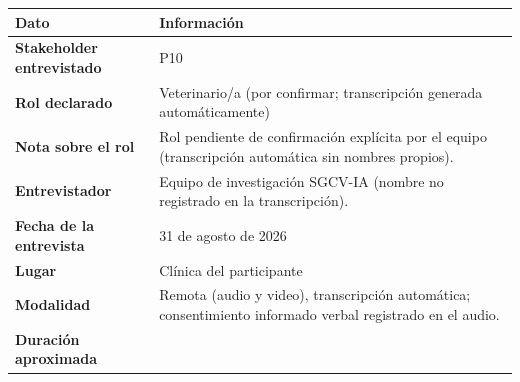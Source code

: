\documentclass[
]{article}
\newcounter{none} %
\begin{document}
{\def\LTcaptype{none} %
\begin{longtable}[]{|
  >{\raggedright\arraybackslash}p{}|
  >{\raggedright\arraybackslash}p{}|}
\hline
\begin{minipage}[b]{\linewidth}\centering
\textbf{Dato}
\end{minipage} & \begin{minipage}[b]{\linewidth}\centering
\textbf{Información}
\end{minipage} \\
\hline
\endhead
\hline
\endlastfoot
\textbf{Stakeholder entrevistado} & \begin{minipage}[t]{\linewidth}\raggedright
P10
\end{minipage} \\
\hline
\textbf{Rol declarado} & \begin{minipage}[t]{\linewidth}\raggedright
Veterinario/a (por confirmar; transcripción generada automáticamente)
\end{minipage} \\
\hline
\textbf{Nota sobre el rol} & \begin{minipage}[t]{\linewidth}\raggedright
Rol pendiente de confirmación explícita por el equipo (transcripción automática sin nombres propios).
\end{minipage} \\
\hline
\textbf{Entrevistador} & \begin{minipage}[t]{\linewidth}\raggedright
Equipo de investigación SGCV-IA (nombre no registrado en la transcripción).
\end{minipage} \\
\hline
\textbf{Fecha de la entrevista} & \begin{minipage}[t]{\linewidth}\raggedright
31 de agosto de 2026
\end{minipage} \\
\hline
\textbf{Lugar} & \begin{minipage}[t]{\linewidth}\raggedright
Clínica del participante
\end{minipage} \\
\hline
\textbf{Modalidad} & \begin{minipage}[t]{\linewidth}\raggedright
Remota (audio y video), transcripción automática; consentimiento informado verbal registrado en el audio.
\end{minipage} \\
\hline
\textbf{Duración aproximada} & \begin{minipage}[t]{\linewidth}\raggedright

\end{minipage}
\end{longtable}}
\end{document}
